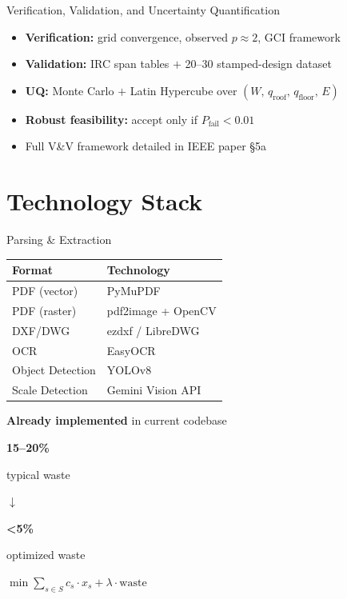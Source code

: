 \documentclass[11pt,aspectratio=169]{beamer}
\begin{document}
\begin{frame}{Verification, Validation, and Uncertainty Quantification}
\begin{itemize}
  \item \textbf{Verification:} grid convergence, observed $p \approx 2$, GCI framework
  \item \textbf{Validation:} IRC span tables $+$ 20--30 stamped-design dataset
  \item \textbf{UQ:} Monte Carlo $+$ Latin Hypercube over $(W,\,q_{\text{roof}},\,q_{\text{floor}},\,E)$
  \item \textbf{Robust feasibility:} accept only if $P_{\text{fail}} < 0.01$
  \item Full V\&V framework detailed in IEEE paper §5a
\end{itemize}
\end{frame}

\section{Technology Stack}

\begin{frame}{Parsing \& Extraction}
\begin{table}
\centering
\begin{tabular}{ll}
\toprule
\textbf{Format} & \textbf{Technology} \\
\midrule
PDF (vector) & PyMuPDF \\
PDF (raster) & pdf2image + OpenCV \\
DXF/DWG & ezdxf / LibreDWG \\
OCR & EasyOCR \\
Object Detection & YOLOv8 \\
Scale Detection & Gemini Vision API \\
\bottomrule
\end{tabular}
\end{table}

\vspace{0.5em}
\textbf{Already implemented} in current codebase
\end{frame}

\begin{frame}{}
\centering
\vspace{2em}
{\Huge \textbf{15--20\%}}

\vspace{1em}
{\large typical waste}

\vspace{2em}
\Huge $\downarrow$

\vspace{2em}
{\Huge \textcolor{vtorange}{\textbf{<5\%}}}

\vspace{1em}
{\large optimized waste}

\vspace{2em}
\small $\min \sum_{s \in S} c_s \cdot x_s + \lambda \cdot \text{waste}$
\end{frame}
\end{document}

